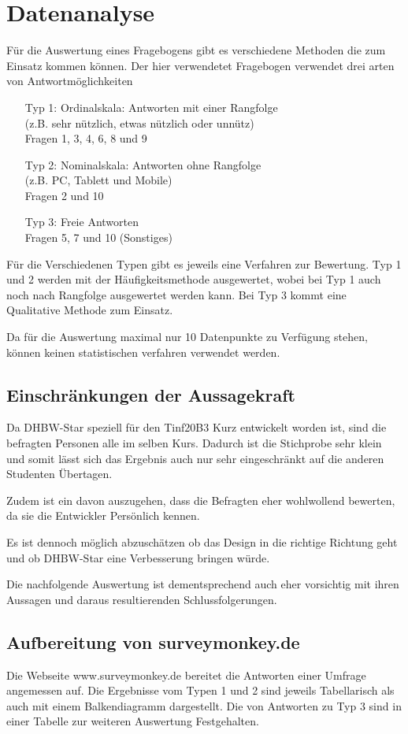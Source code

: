 \chapter{Datenanalyse}
Für die Auswertung eines Fragebogens gibt es verschiedene Methoden die zum Einsatz kommen können. Der hier verwendetet Fragebogen verwendet drei arten von Antwortmöglichkeiten
\begin{itemize}
	\item[Typ 1:] {Ordinalskala: Antworten mit einer Rangfolge\\
		(z.B. sehr nützlich, etwas nützlich oder unnütz)\\
		Fragen 1, 3, 4, 6, 8 und 9}
	\item[Typ 2:] {Nominalskala: Antworten ohne Rangfolge\\
		(z.B. PC, Tablett und Mobile)\\
		Fragen 2 und 10}
	\item[Typ 3:] {Freie Antworten \\
		Fragen 5, 7 und 10 (Sonstiges)}
\end{itemize}
Für die Verschiedenen Typen gibt es jeweils eine Verfahren zur Bewertung.
Typ 1 und 2 werden mit der Häufigkeitsmethode ausgewertet, wobei bei Typ 1 auch noch nach Rangfolge ausgewertet werden kann. Bei Typ 3 kommt eine Qualitative Methode zum Einsatz.

Da für die Auswertung maximal nur 10 Datenpunkte zu Verfügung stehen, können keinen statistischen verfahren verwendet werden.

\section{Einschränkungen der Aussagekraft}
Da DHBW-Star speziell für den Tinf20B3 Kurz entwickelt worden ist, sind die befragten Personen alle im selben Kurs. Dadurch ist die Stichprobe sehr klein und somit lässt sich das Ergebnis auch nur sehr eingeschränkt auf die anderen Studenten Übertagen.

Zudem ist ein davon auszugehen, dass die Befragten eher wohlwollend bewerten, da sie die Entwickler Persönlich kennen.

Es ist dennoch möglich abzuschätzen ob das Design in die richtige Richtung geht und ob DHBW-Star eine Verbesserung bringen würde.

Die nachfolgende Auswertung ist dementsprechend auch eher vorsichtig mit ihren Aussagen und daraus resultierenden Schlussfolgerungen.

\section{Aufbereitung von surveymonkey.de}
Die Webseite www.surveymonkey.de bereitet die Antworten einer Umfrage angemessen auf. Die Ergebnisse vom Typen 1 und 2 sind jeweils Tabellarisch als auch mit einem Balkendiagramm dargestellt.
Die von Antworten zu Typ 3 sind in einer Tabelle zur weiteren Auswertung Festgehalten.

